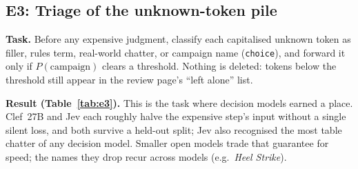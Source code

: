 \documentclass[11pt]{article}
\begin{document}
\subsection{E3: Triage of the unknown-token pile}
\textbf{Task.} Before any expensive judgment, classify each capitalised unknown token as filler,
rules term, real-world chatter, or campaign name (\texttt{choice}), and forward it only if
$P(\text{campaign})$ clears a threshold. Nothing is deleted: tokens below the threshold still appear
in the review page's ``left alone'' list.

\begin{table}[t]
\centering
\small
{}
\caption{E3, 864 tokens, 84 of them real names. ``Fwd.'' is the share of tokens sent on to the
expensive step at the threshold achieving the stated number of misses; ranges span two readouts of
the same answer ($P(\text{campaign})$ and $1 - P(\text{filler}) - P(\text{realworld})$). ``Held-out
halves'': a threshold set at half the lowest name score on one half of the sessions, applied to the
other half.}
\label{tab:e3}
\end{table}

\textbf{Result (Table~\ref{tab:e3}).} This is the task where decision models earned a place. Clef~27B
and Jev each roughly halve the expensive step's input without a single silent loss, and both survive a
held-out split; Jev also recognised the most table chatter of any decision model. Smaller open models trade that guarantee for speed; the names they drop recur across
models (e.g.\ \emph{Heel Strike}).
\end{document}
